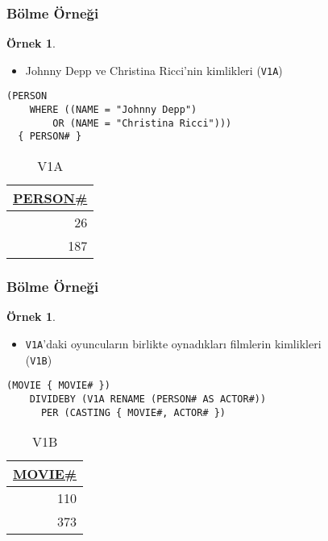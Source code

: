 \documentclass[dvipsnames]{beamer}
\theoremstyle{definition}
\theoremstyle{example}
\newtheorem{ornek}[theorem]{Örnek}
\theoremstyle{plain}
\begin{document}
\begin{frame}[fragile]
  \frametitle{Bölme Örneği}

  \begin{ornek}
    \begin{itemize}
      \item Johnny Depp ve Christina Ricci'nin kimlikleri (\texttt{V1A})
    \end{itemize}

    \begin{lstlisting}
(PERSON
    WHERE ((NAME = "Johnny Depp")
        OR (NAME = "Christina Ricci")))
  { PERSON# }
    \end{lstlisting}

    \pause
    \vspace{-10pt}
    \begin{tiny}
    \begin{table}
      \caption{V1A}
      \begin{tabular}{|r|}\hline
\underline{PERSON\#}\\[2pt]\hline\hline
                  26\\\hline
                 187\\\hline
      \end{tabular}
    \end{table}
    \end{tiny}
  \end{ornek}
\end{frame}

\begin{frame}[fragile]
  \frametitle{Bölme Örneği}

  \begin{ornek}
    \begin{itemize}
      \item \texttt{V1A}'daki oyuncuların birlikte oynadıkları filmlerin
        kimlikleri\\
        (\texttt{V1B})
    \end{itemize}

    \begin{lstlisting}
(MOVIE { MOVIE# })
    DIVIDEBY (V1A RENAME (PERSON# AS ACTOR#))
      PER (CASTING { MOVIE#, ACTOR# })
    \end{lstlisting}

    \pause
    \vspace{-10pt}
    \begin{tiny}
    \begin{table}
      \caption{V1B}
      \begin{tabular}{|r|}\hline
\underline{MOVIE\#}\\[2pt]\hline\hline
                110\\\hline
                373\\\hline
      \end{tabular}
    \end{table}
    \end{tiny}
  \end{ornek}
\end{frame}
\end{document}
